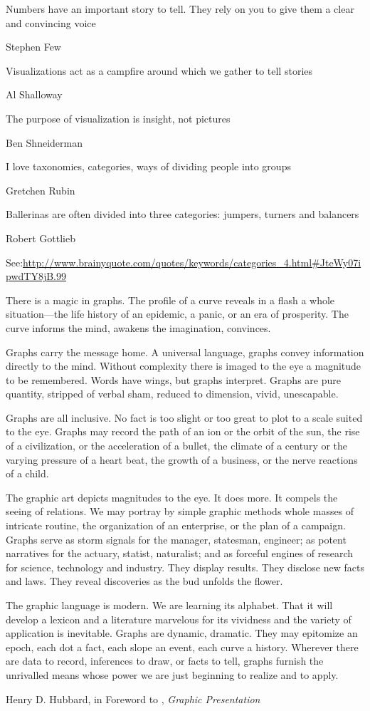 \epigraph{Numbers have an important story to tell. They rely on you to give them a clear and convincing voice}{Stephen Few}

\epigraph{Visualizations act as a campfire around which we gather to tell stories}{Al Shalloway}

\epigraph{The purpose of visualization is insight, not pictures}{Ben Shneiderman}


\epigraph{I love taxonomies, categories, ways of dividing people into groups}{Gretchen Rubin}

\epigraph{Ballerinas are often divided into three categories: jumpers, turners and balancers}{Robert Gottlieb}

See:\url{http://www.brainyquote.com/quotes/keywords/categories_4.html#JteWy07ipwdTY8jB.99}

\epigraph{There is a magic in graphs. The profile of a curve reveals in a flash a whole situation---the life history of an epidemic, a panic, or an era of prosperity. The curve informs the mind, awakens the imagination, convinces.

Graphs carry the message home. A universal language, graphs convey information directly to the mind. Without complexity there is imaged to the eye a magnitude to be remembered. Words have wings, but graphs interpret. Graphs are pure quantity, stripped of verbal sham, reduced to dimension, vivid, unescapable.

Graphs are all inclusive. No fact is too slight or too great to plot to a scale suited to the eye. Graphs may record the path of an ion or the orbit of the sun, the rise of a civilization, or the acceleration of a bullet, the climate of a century or the varying pressure of a heart beat, the growth of a business, or the nerve reactions of a child.

The graphic art depicts magnitudes to the eye. It does more. It compels the seeing of relations. We may portray by simple graphic methods whole masses of intricate routine, the organization of an enterprise, or the plan of a campaign. Graphs serve as storm signals for the manager, statesman, engineer; as potent narratives for the actuary, statist, naturalist; and as forceful engines of research for science, technology and industry. They display results. They disclose new facts and laws. They reveal discoveries as the bud unfolds the flower.

The graphic language is modern. We are learning its alphabet. That it will develop a lexicon and a literature marvelous for its vividness and the variety of application is inevitable. Graphs are dynamic, dramatic. They may epitomize an epoch, each dot a fact, each slope an event, each curve a history. Wherever there are data to record, inferences to draw, or facts to tell, graphs furnish the unrivalled means whose power we are just beginning to realize and to apply.}{Henry D. Hubbard, in Foreword to \citet{Brinton:1939}, \emph{Graphic Presentation}}

